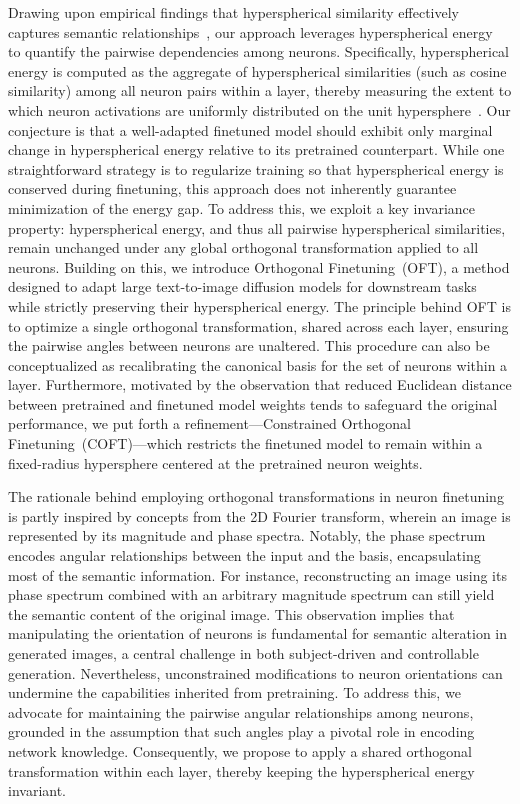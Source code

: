 Drawing upon empirical findings that hyperspherical similarity effectively captures semantic relationships~\cite{liu2017deep,liu2018decoupled,chen2020angular}, our approach leverages hyperspherical energy~\cite{liu2018learning} to quantify the pairwise dependencies among neurons. Specifically, hyperspherical energy is computed as the aggregate of hyperspherical similarities (such as cosine similarity) among all neuron pairs within a layer, thereby measuring the extent to which neuron activations are uniformly distributed on the unit hypersphere~\cite{liu2021learning}. Our conjecture is that a well-adapted finetuned model should exhibit only marginal change in hyperspherical energy relative to its pretrained counterpart. While one straightforward strategy is to regularize training so that hyperspherical energy is conserved during finetuning, this approach does not inherently guarantee minimization of the energy gap. To address this, we exploit a key invariance property: hyperspherical energy, and thus all pairwise hyperspherical similarities, remain unchanged under any global orthogonal transformation applied to all neurons. Building on this, we introduce Orthogonal Finetuning~(OFT), a method designed to adapt large text-to-image diffusion models for downstream tasks while strictly preserving their hyperspherical energy. The principle behind OFT is to optimize a single orthogonal transformation, shared across each layer, ensuring the pairwise angles between neurons are unaltered. This procedure can also be conceptualized as recalibrating the canonical basis for the set of neurons within a layer. Furthermore, motivated by the observation that reduced Euclidean distance between pretrained and finetuned model weights tends to safeguard the original performance, we put forth a refinement—Constrained Orthogonal Finetuning~(COFT)—which restricts the finetuned model to remain within a fixed-radius hypersphere centered at the pretrained neuron weights.

The rationale behind employing orthogonal transformations in neuron finetuning is partly inspired by concepts from the 2D Fourier transform, wherein an image is represented by its magnitude and phase spectra. Notably, the phase spectrum encodes angular relationships between the input and the basis, encapsulating most of the semantic information. For instance, reconstructing an image using its phase spectrum combined with an arbitrary magnitude spectrum can still yield the semantic content of the original image. This observation implies that manipulating the orientation of neurons is fundamental for semantic alteration in generated images, a central challenge in both subject-driven and controllable generation. Nevertheless, unconstrained modifications to neuron orientations can undermine the capabilities inherited from pretraining. To address this, we advocate for maintaining the pairwise angular relationships among neurons, grounded in the assumption that such angles play a pivotal role in encoding network knowledge. Consequently, we propose to apply a shared orthogonal transformation within each layer, thereby keeping the hyperspherical energy invariant.

